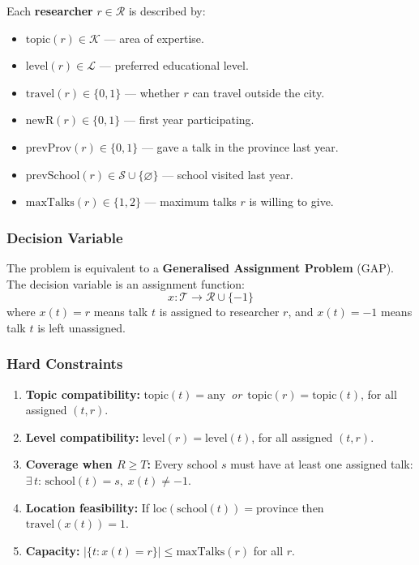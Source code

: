 \documentclass[12pt, a4paper]{article}
\begin{document}
Each \textbf{researcher} $r \in \mathcal{R}$ is described by:
\begin{itemize}[itemsep=0.1em]
  \item $\text{topic}(r) \in \mathcal{K}$ — area of expertise.
  \item $\text{level}(r) \in \mathcal{L}$ — preferred educational level.
  \item $\text{travel}(r) \in \{0,1\}$ — whether $r$ can travel outside the city.
  \item $\text{newR}(r) \in \{0,1\}$ — first year participating.
  \item $\text{prevProv}(r) \in \{0,1\}$ — gave a talk in the province last year.
  \item $\text{prevSchool}(r) \in \mathcal{S} \cup \{\varnothing\}$ — school visited last year.
  \item $\text{maxTalks}(r) \in \{1, 2\}$ — maximum talks $r$ is willing to give.
\end{itemize}

\subsubsection{Decision Variable}

The problem is equivalent to a \textbf{Generalised Assignment Problem} (GAP). The
decision variable is an assignment function:
\begin{equation}
  x : \mathcal{T} \to \mathcal{R} \cup \{-1\}
\end{equation}
where $x(t) = r$ means talk $t$ is assigned to researcher $r$, and $x(t) = -1$
means talk $t$ is left unassigned.

\subsubsection{Hard Constraints}

\begin{enumerate}[label=\textbf{HC\arabic*.}, leftmargin=3em, itemsep=0.3em]
  \item \textbf{Topic compatibility:} $\text{topic}(t) = \text{any}$ \,\textit{or}\,
        $\text{topic}(r) = \text{topic}(t)$, for all assigned $(t, r)$.
  \item \textbf{Level compatibility:} $\text{level}(r) = \text{level}(t)$, for all
        assigned $(t, r)$.
  \item \textbf{Coverage when $R \geq T$:} Every school $s$ must have at least one
        assigned talk: $\exists\, t\!:\,\text{school}(t)=s,\;x(t)\neq -1$.
  \item \textbf{Location feasibility:} If $\text{loc}(\text{school}(t)) = \text{province}$
        then $\text{travel}(x(t)) = 1$.
  \item \textbf{Capacity:} $|\{t : x(t) = r\}| \leq \text{maxTalks}(r)$ for all $r$.
\end{enumerate}
\end{document}
